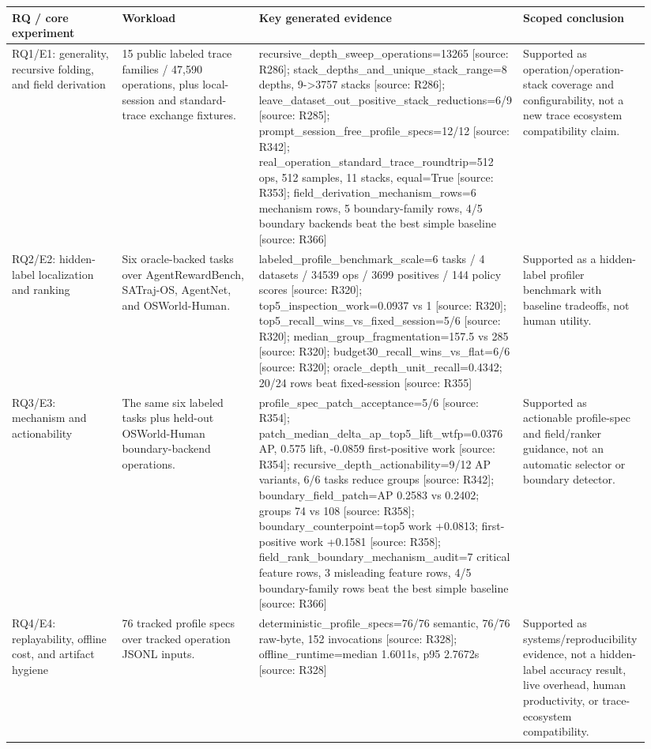 \begin{tabular}{p{0.18\linewidth}p{0.22\linewidth}p{0.34\linewidth}p{0.20\linewidth}}
  \toprule
  RQ / core experiment & Workload & Key generated evidence & Scoped conclusion \\
  \midrule
  RQ1/E1: generality, recursive folding, and field derivation & 15 public labeled trace families / 47,590 operations, plus local-session and standard-trace exchange fixtures. & recursive\_depth\_sweep\_operations=13265 [source: R286]; stack\_depths\_and\_unique\_stack\_range=8 depths, 9->3757 stacks [source: R286]; leave\_dataset\_out\_positive\_stack\_reductions=6/9 [source: R285]; prompt\_session\_free\_profile\_specs=12/12 [source: R342]; real\_operation\_standard\_trace\_roundtrip=512 ops, 512 samples, 11 stacks, equal=True [source: R353]; field\_derivation\_mechanism\_rows=6 mechanism rows, 5 boundary-family rows, 4/5 boundary backends beat the best simple baseline [source: R366] & Supported as operation/operation-stack coverage and configurability, not a new trace ecosystem compatibility claim. \\
  RQ2/E2: hidden-label localization and ranking & Six oracle-backed tasks over AgentRewardBench, SATraj-OS, AgentNet, and OSWorld-Human. & labeled\_profile\_benchmark\_scale=6 tasks / 4 datasets / 34539 ops / 3699 positives / 144 policy scores [source: R320]; top5\_inspection\_work=0.0937 vs 1 [source: R320]; top5\_recall\_wins\_vs\_fixed\_session=5/6 [source: R320]; median\_group\_fragmentation=157.5 vs 285 [source: R320]; budget30\_recall\_wins\_vs\_flat=6/6 [source: R320]; oracle\_depth\_unit\_recall=0.4342; 20/24 rows beat fixed-session [source: R355] & Supported as a hidden-label profiler benchmark with baseline tradeoffs, not human utility. \\
  RQ3/E3: mechanism and actionability & The same six labeled tasks plus held-out OSWorld-Human boundary-backend operations. & profile\_spec\_patch\_acceptance=5/6 [source: R354]; patch\_median\_delta\_ap\_top5\_lift\_wtfp=0.0376 AP, 0.575 lift, -0.0859 first-positive work [source: R354]; recursive\_depth\_actionability=9/12 AP variants, 6/6 tasks reduce groups [source: R342]; boundary\_field\_patch=AP 0.2583 vs 0.2402; groups 74 vs 108 [source: R358]; boundary\_counterpoint=top5 work +0.0813; first-positive work +0.1581 [source: R358]; field\_rank\_boundary\_mechanism\_audit=7 critical feature rows, 3 misleading feature rows, 4/5 boundary-family rows beat the best simple baseline [source: R366] & Supported as actionable profile-spec and field/ranker guidance, not an automatic selector or boundary detector. \\
  RQ4/E4: replayability, offline cost, and artifact hygiene & 76 tracked profile specs over tracked operation JSONL inputs. & deterministic\_profile\_specs=76/76 semantic, 76/76 raw-byte, 152 invocations [source: R328]; offline\_runtime=median 1.6011s, p95 2.7672s [source: R328] & Supported as systems/reproducibility evidence, not a hidden-label accuracy result, live overhead, human productivity, or trace-ecosystem compatibility. \\
  \bottomrule
\end{tabular}
